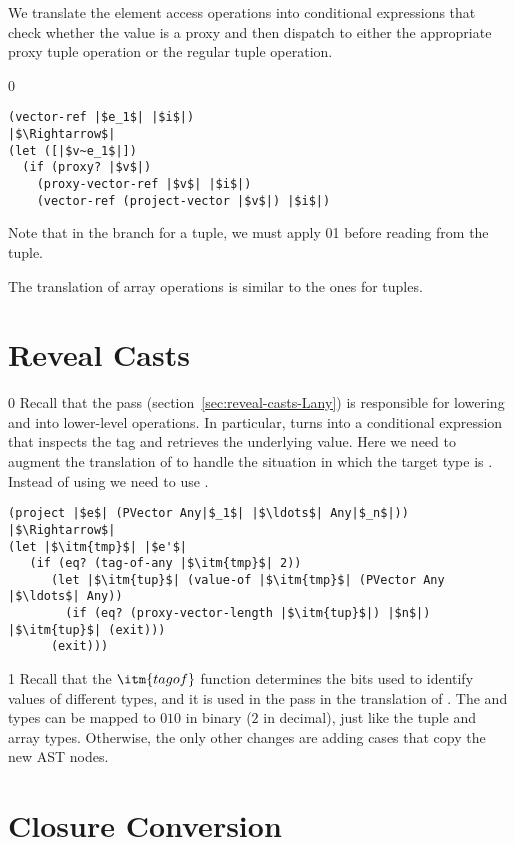 \documentclass[7x10]{TimesAPriori_MIT}%
\def\racketEd{0}
\def\pythonEd{1}
\def\edition{1}
\newcommand{\racket}[1]{{\if\edition\racketEd{#1}\fi}}
\newcommand{\pythonColor}[0]{}
\newcommand{\python}[1]{{\if\edition\pythonEd\pythonColor #1\fi}}
\numberwithin{theorem}{chapter}
\numberwithin{definition}{chapter}
\numberwithin{equation}{chapter}
\begin{document}
We translate the element access operations into conditional
expressions that check whether the value is a proxy and then dispatch
to either the appropriate proxy tuple operation or the regular tuple
operation.
{\if\edition\racketEd    
\begin{lstlisting}
(vector-ref |$e_1$| |$i$|)
|$\Rightarrow$|
(let ([|$v~e_1$|])
  (if (proxy? |$v$|)
    (proxy-vector-ref |$v$| |$i$|)
    (vector-ref (project-vector |$v$|) |$i$|)
\end{lstlisting}
\fi}
%
Note that in the branch for a tuple, we must apply
\racket{}\python{} before reading
from the tuple.

The translation of array operations is similar to the ones for tuples.


\section{Reveal Casts }
\label{sec:reveal-casts-gradual}

{\if\edition\racketEd    
Recall that the  pass
(section~\ref{sec:reveal-casts-Lany}) is responsible for lowering
 and  into lower-level operations.
%
In particular,  turns into a conditional expression that
inspects the tag and retrieves the underlying value.  Here we need to
augment the translation of  to handle the situation in which
the target type is .  Instead of using
 we need to use .
\begin{lstlisting}
(project |$e$| (PVector Any|$_1$| |$\ldots$| Any|$_n$|))
|$\Rightarrow$|
(let |$\itm{tmp}$| |$e'$|
   (if (eq? (tag-of-any |$\itm{tmp}$| 2))
      (let |$\itm{tup}$| (value-of |$\itm{tmp}$| (PVector Any |$\ldots$| Any))
        (if (eq? (proxy-vector-length |$\itm{tup}$|) |$n$|) |$\itm{tup}$| (exit)))
      (exit)))
\end{lstlisting}
\fi}
%
{\if\edition\pythonEd\pythonColor
Recall that the $\itm{tagof}$ function determines the bits used to
identify values of different types, and it is used in the 
pass in the translation of . The \PTUPLETYNAME{} and
\PARRAYTYNAME{} types can be mapped to $010$ in binary ($2$ in
decimal), just like the tuple and array types.
\fi}  
%
Otherwise, the only other changes are adding cases that copy the new AST nodes.

\pagebreak

\section{Closure Conversion }
\label{sec:closure-conversion-gradual}
\end{document}
